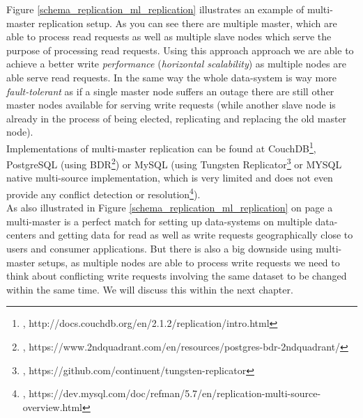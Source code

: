 {Figure \ref{schema_replication_ml_replication} illustrates an example of multi-master replication setup. As you can see there are multiple master, which are able to process read requests as well as multiple slave nodes which serve the purpose of processing read requests. Using this approach approach we are able to achieve a better write \textit{performance} (\textit{horizontal scalability}) as multiple nodes are able serve read requests. In the same way the whole data-system is way more \textit{fault-tolerant} as if a single master node suffers an outage there are still other master nodes available for serving write requests (while another slave node is already in the process of being elected, replicating and replacing the old master node).\\
Implementations of multi-master replication can be found at CouchDB\footnote{\cite{CDBMM}, http://docs.couchdb.org/en/2.1.2/replication/intro.html}, PostgreSQL (using BDR\footnote{\cite{PSQLBDR}, https://www.2ndquadrant.com/en/resources/postgres-bdr-2ndquadrant/}) or MySQL (using Tungsten Replicator\footnote{\cite{TNGSTNREP}, https://github.com/continuent/tungsten-replicator} or MYSQL native multi-source implementation, which is very limited and does not even provide any conflict detection or resolution\footnote{\cite{MYSQLMS}, https://dev.mysql.com/doc/refman/5.7/en/replication-multi-source-overview.html}).\\
As also illustrated in Figure \ref{schema_replication_ml_replication} on page \pageref{schema_replication_ml_replication} a multi-master is a perfect match for setting up data-systems on multiple data-centers and getting data for read as well as write requests geographically close to users and consumer applications. But there is also a big downside using multi-master setups, as multiple nodes are able to process write requests we need to think about conflicting write requests involving the same dataset to be changed within the same time. We will discuss this within the next chapter.

}
